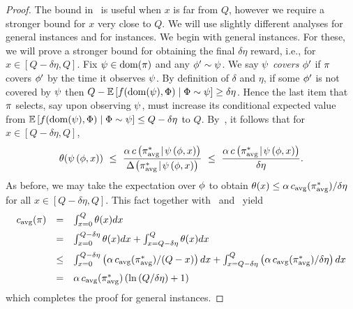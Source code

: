 \begin{proof}
%


The bound in~ is useful when $x$ is far from
$Q$, however we require a stronger bound for $x$ very close to $Q$.
We will use slightly different analyses for general instances and for 
\certifying instances.  We begin with general instances.
For these, we will prove a stronger bound for obtaining the final
$\delta\eta$ reward, i.e., for $x \in [Q - \delta\eta, Q]$.
Fix $\prlz \in \dom(\policy)$ and any $\rlz' \sim \prlz$.
We say $\prlz$ \emph{covers} $\rlz'$ if 
$\policy$ covers $\rlz'$ by the time it observes $\prlz$. 
By definition of $\delta$ and $\eta$, if some $\rlz'$ is
not covered by $\prlz$ then 
$Q - \progress{\prlz} \ge 
\delta \eta$.
Hence the last item that $\policy$ selects, say upon observing
$\prlz$, must increase its conditional expected
value from $\progress{\prlz} \le Q - \delta \eta$ to $Q$.
By~, it follows that for $x \in [Q - \delta \eta,
Q]$, 
$$
\price(\ptrace{\rlz}{x})
\ \le \  \frac{\alpha \, \condcost{\ptrace{\rlz}{x}}{\piavg} } {
  \diff{\ptrace{\rlz}{x}}{ \piavg } }\  \le \ \frac{\alpha \, \condcost{\ptrace{\rlz}{x}}{\piavg} } {
  \delta \eta}. $$
As before, we may take the expectation over $\rlz$ to obtain 
$\price(x) \le \alpha \, \acst{\policycover} / \delta \eta$ for all $x \in [Q - \delta \eta,
Q]$.
This fact together with~ and~ 
yield 
\[
\begin{array}{lcl}
\acst{\policy} & = & \int_{x=0}^{Q}  \price(x) dx \vspace{2mm}\\
  & = & \int_{x=0}^{Q - \delta\eta} \price(x) dx + \int_{x=Q-\delta\eta}^{Q}
  \price(x) dx \vspace{2mm}\\
  & \le & \int_{x=0}^{Q - \delta\eta} \paren{\alpha \,
    \acst{\policycover} / (Q - x)}  dx + \int_{x=Q-\delta\eta}^{Q}
  \paren{\alpha \, \acst{\policycover} / \delta \eta}   dx \vspace{2mm}\\
 & = &  \alpha \, \acst{\policycover} \paren{\ln \paren{Q/\delta\eta} +1}  
\end{array}
\]
which completes the proof for general instances.



\end{proof}
